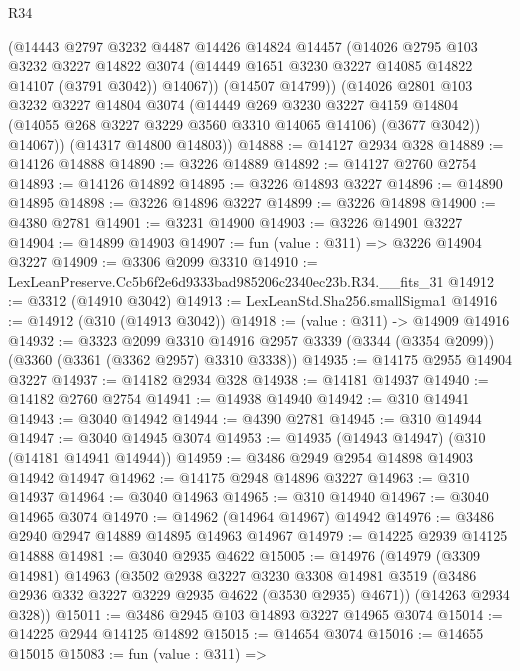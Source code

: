 \begin{lexlean}{R34}
\begin{coremodule}
          (@14443
            @2797
            @3232
            @4487
            @14426
            @14824
            @14457
            (@14026
              @2795
              @103
              @3232
              @3227
              @14822
              @3074
              (@14449 @1651 @3230 @3227 @14085 @14822 @14107 (@3791 @3042))
              @14067))
          (@14507 @14799))
        (@14026
          @2801
          @103
          @3232
          @3227
          @14804
          @3074
          (@14449
            @269
            @3230
            @3227
            @4159
            @14804
            (@14055 @268 @3227 @3229 @3560 @3310 @14065 @14106)
            (@3677 @3042))
          @14067))
      (@14317 @14800 @14803))
@14888 := @14127 @2934 @328
@14889 := @14126 @14888
@14890 := @3226 @14889
@14892 := @14127 @2760 @2754
@14893 := @14126 @14892
@14895 := @3226 @14893 @3227
@14896 := @14890 @14895
@14898 := @3226 @14896 @3227
@14899 := @3226 @14898
@14900 := @4380 @2781
@14901 := @3231 @14900
@14903 := @3226 @14901 @3227
@14904 := @14899 @14903
@14907 := fun (value : @311) => @3226 @14904 @3227
@14909 := @3306 @2099 @3310
@14910 := LexLeanPreserve.Cc5b6f2e6d9333bad985206c2340ec23b.R34.__fits_31
@14912 := @3312 (@14910 @3042)
@14913 := LexLeanStd.Sha256.smallSigma1
@14916 := @14912 (@310 (@14913 @3042))
@14918 := (value : @311) -> @14909 @14916
@14932 := @3323
    @2099
    @3310
    @14916
    @2957
    @3339
    (@3344 (@3354 @2099))
    (@3360 (@3361 (@3362 @2957) @3310 @3338))
@14935 := @14175 @2955 @14904 @3227
@14937 := @14182 @2934 @328
@14938 := @14181 @14937
@14940 := @14182 @2760 @2754
@14941 := @14938 @14940
@14942 := @310 @14941
@14943 := @3040 @14942
@14944 := @4390 @2781
@14945 := @310 @14944
@14947 := @3040 @14945 @3074
@14953 := @14935 (@14943 @14947) (@310 (@14181 @14941 @14944))
@14959 := @3486 @2949 @2954 @14898 @14903 @14942 @14947
@14962 := @14175 @2948 @14896 @3227
@14963 := @310 @14937
@14964 := @3040 @14963
@14965 := @310 @14940
@14967 := @3040 @14965 @3074
@14970 := @14962 (@14964 @14967) @14942
@14976 := @3486 @2940 @2947 @14889 @14895 @14963 @14967
@14979 := @14225 @2939 @14125 @14888
@14981 := @3040 @2935 @4622
@15005 := @14976
    (@14979
      (@3309 @14981)
      @14963
      (@3502
        @2938
        @3227
        @3230
        @3308
        @14981
        @3519
        (@3486 @2936 @332 @3227 @3229 @2935 @4622 (@3530 @2935) @4671))
      (@14263 @2934 @328))
@15011 := @3486 @2945 @103 @14893 @3227 @14965 @3074
@15014 := @14225 @2944 @14125 @14892
@15015 := @14654 @3074
@15016 := @14655 @15015
@15083 := fun (value : @311) =>

\end{coremodule}
\end{lexlean}

